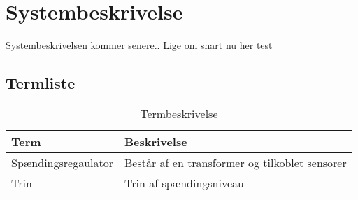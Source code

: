
\section{Systembeskrivelse}

Systembeskrivelsen kommer senere.. Lige om snart nu her test


\subsection{Termliste}

\begin{table}[htbp]
\centering
\begin{tabular}{|l|l|}
\hline
\textbf{Term} 	& \textbf{Beskrivelse} \\\hline
Spændingsregaulator	& Består af en transformer og tilkoblet sensorer \\\hline
Trin 	& Trin af spændingsniveau \\\hline

\end{tabular}
\caption{Termbeskrivelse}
\label{tab:termbeskrivelsen}

\end{table}